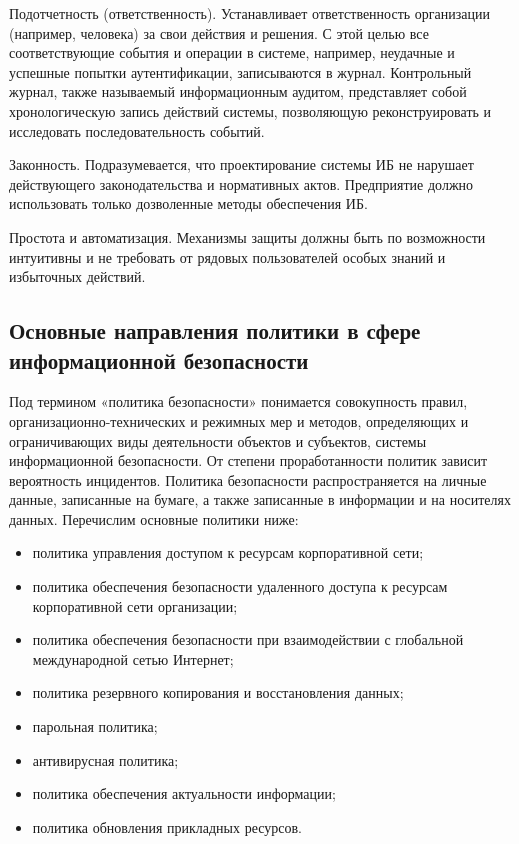Подотчетность (ответственность). Устанавливает ответственность
организации (например, человека) за свои действия и решения. С этой целью
все соответствующие события и операции в системе, например, неудачные и
успешные попытки аутентификации, записываются в журнал. Контрольный
журнал, также называемый информационным аудитом, представляет собой
хронологическую запись действий системы, позволяющую реконструировать
и исследовать последовательность событий.

Законность. Подразумевается, что проектирование системы ИБ не
нарушает действующего законодательства и нормативных актов. Предприятие
должно использовать только дозволенные методы обеспечения ИБ.

Простота и автоматизация. Механизмы защиты должны быть по
возможности интуитивны и не требовать от рядовых пользователей особых
знаний и избыточных действий.

\subsection{Основные направления политики в сфере информационной безопасности}
\label{subsec:mechanisms:directions}

Под термином «политика безопасности» понимается совокупность
правил, организационно-технических и режимных мер и методов,
определяющих и ограничивающих виды деятельности объектов и субъектов,
системы информационной безопасности. От степени проработанности
политик зависит вероятность инцидентов.
Политика безопасности распространяется на личные данные,
записанные на бумаге, а также записанные в информации и на носителях
данных.
Перечислим основные политики ниже:
\begin{itemize}
	\item политика управления доступом к ресурсам корпоративной сети;
	\item политика обеспечения безопасности удаленного доступа к ресурсам корпоративной сети организации;
	\item политика обеспечения безопасности при взаимодействии с глобальной международной сетью Интернет;
	\item политика резервного копирования и восстановления данных;
	\item парольная политика;
	\item антивирусная политика;
	\item политика обеспечения актуальности информации;
	\item политика обновления прикладных ресурсов.
\end{itemize}

